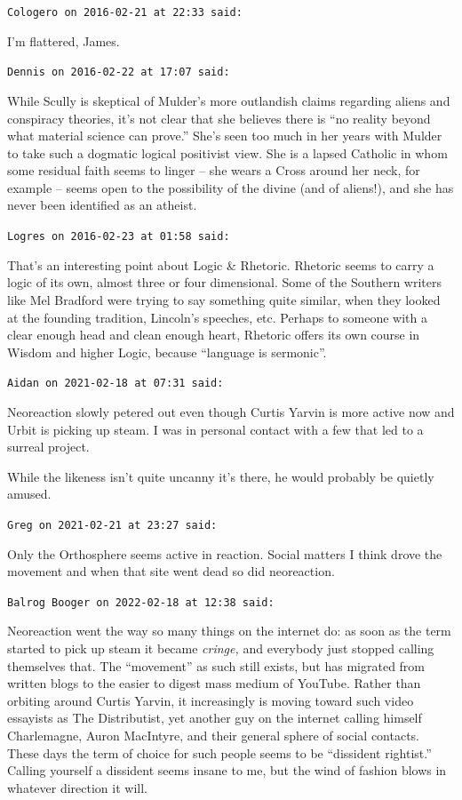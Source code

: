 \begin{footnotesize}
\begin{sffamily}
\hfill

\texttt{Cologero on 2016-02-21 at 22:33 said:}

I'm flattered, James.

\hfill

\texttt{Dennis on 2016-02-22 at 17:07 said:}

While Scully is skeptical of Mulder's more outlandish claims regarding aliens and conspiracy theories, it's not clear that she believes there is ``no reality beyond what material science can prove.'' She's seen too much in her years with Mulder to take such a dogmatic logical positivist view. She is a lapsed Catholic in whom some residual faith seems to linger -- she wears a Cross around her neck, for example -- seems open to the possibility of the divine (and of aliens!), and she has never been identified as an atheist.

\hfill

\texttt{Logres on 2016-02-23 at 01:58 said:}

That's an interesting point about Logic \& Rhetoric. Rhetoric seems to carry a logic of its own, almost three or four dimensional. Some of the Southern writers like Mel Bradford were trying to say something quite similar, when they looked at the founding tradition, Lincoln's speeches, etc. Perhaps to someone with a clear enough head and clean enough heart, Rhetoric offers its own course in Wisdom and higher Logic, because ``language is sermonic''.

\hfill

\texttt{Aidan on 2021-02-18 at 07:31 said:}

Neoreaction slowly petered out even though Curtis Yarvin is more active now and Urbit is picking up steam. I was in personal contact with a few that led to a surreal project.

While the likeness isn't quite uncanny it's there, he would probably be quietly amused.

\hfill

\texttt{Greg on 2021-02-21 at 23:27 said:}

Only the Orthosphere seems active in reaction. Social matters I think drove the movement and when that site went dead so did neoreaction.

\hfill

\texttt{Balrog Booger on 2022-02-18 at 12:38 said:}

Neoreaction went the way so many things on the internet do: as soon as the term started to pick up steam it became \emph{cringe,} and everybody just stopped calling themselves that. The ``movement'' as such still exists, but has migrated from written blogs to the easier to digest mass medium of YouTube. Rather than orbiting around Curtis Yarvin, it increasingly is moving toward such video essayists as The Distributist, yet another guy on the internet calling himself Charlemagne, Auron MacIntyre, and their general sphere of social contacts. These days the term of choice for such people seems to be ``dissident rightist.'' Calling yourself a dissident seems insane to me, but the wind of fashion blows in whatever direction it will.


\end{sffamily}
\end{footnotesize}
